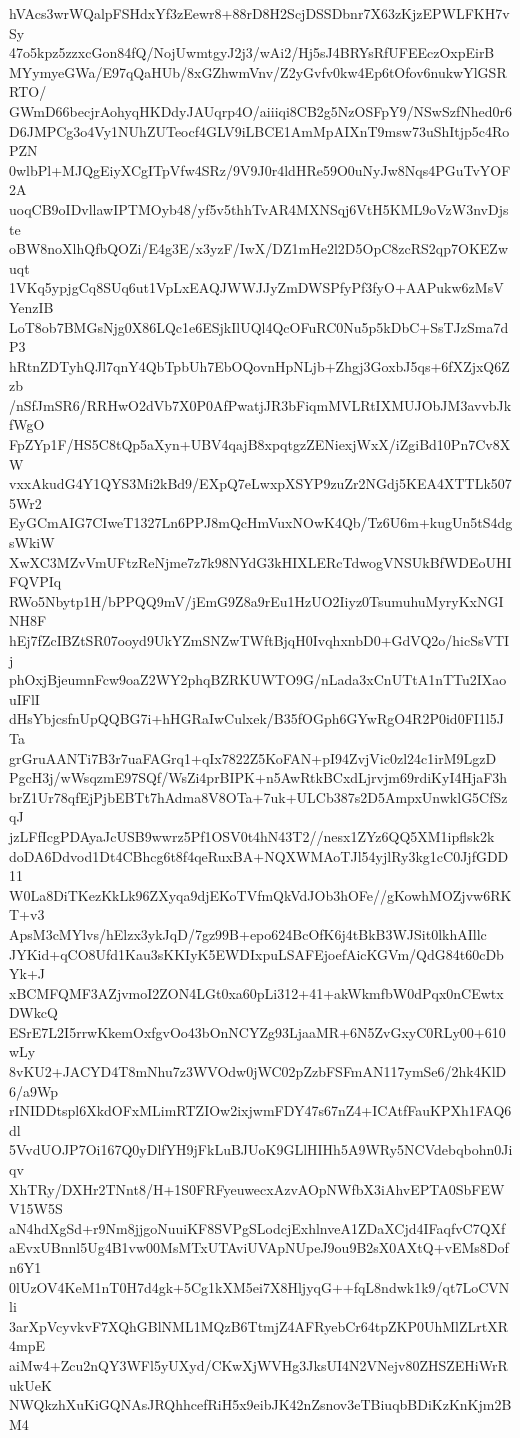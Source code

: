 hVAcs3wrWQalpFSHdxYf3zEewr8+88rD8H2ScjDSSDbnr7X63zKjzEPWLFKH7vSy
47o5kpz5zzxcGon84fQ/NojUwmtgyJ2j3/wAi2/Hj5sJ4BRYsRfUFEEczOxpEirB
MYymyeGWa/E97qQaHUb/8xGZhwmVnv/Z2yGvfv0kw4Ep6tOfov6nukwYlGSRRTO/
GWmD66becjrAohyqHKDdyJAUqrp4O/aiiiqi8CB2g5NzOSFpY9/NSwSzfNhed0r6
D6JMPCg3o4Vy1NUhZUTeocf4GLV9iLBCE1AmMpAIXnT9msw73uShItjp5c4RoPZN
0wlbPl+MJQgEiyXCgITpVfw4SRz/9V9J0r4ldHRe59O0uNyJw8Nqs4PGuTvYOF2A
uoqCB9oIDvllawIPTMOyb48/yf5v5thhTvAR4MXNSqj6VtH5KML9oVzW3nvDjste
oBW8noXlhQfbQOZi/E4g3E/x3yzF/IwX/DZ1mHe2l2D5OpC8zcRS2qp7OKEZwuqt
1VKq5ypjgCq8SUq6ut1VpLxEAQJWWJJyZmDWSPfyPf3fyO+AAPukw6zMsVYenzIB
LoT8ob7BMGsNjg0X86LQc1e6ESjkIlUQl4QcOFuRC0Nu5p5kDbC+SsTJzSma7dP3
hRtnZDTyhQJl7qnY4QbTpbUh7EbOQovnHpNLjb+Zhgj3GoxbJ5qs+6fXZjxQ6Zzb
/nSfJmSR6/RRHwO2dVb7X0P0AfPwatjJR3bFiqmMVLRtIXMUJObJM3avvbJkfWgO
FpZYp1F/HS5C8tQp5aXyn+UBV4qajB8xpqtgzZENiexjWxX/iZgiBd10Pn7Cv8XW
vxxAkudG4Y1QYS3Mi2kBd9/EXpQ7eLwxpXSYP9zuZr2NGdj5KEA4XTTLk5075Wr2
EyGCmAIG7CIweT1327Ln6PPJ8mQcHmVuxNOwK4Qb/Tz6U6m+kugUn5tS4dgsWkiW
XwXC3MZvVmUFtzReNjme7z7k98NYdG3kHIXLERcTdwogVNSUkBfWDEoUHIFQVPIq
RWo5Nbytp1H/bPPQQ9mV/jEmG9Z8a9rEu1HzUO2Iiyz0TsumuhuMyryKxNGINH8F
hEj7fZcIBZtSR07ooyd9UkYZmSNZwTWftBjqH0IvqhxnbD0+GdVQ2o/hicSsVTIj
phOxjBjeumnFcw9oaZ2WY2phqBZRKUWTO9G/nLada3xCnUTtA1nTTu2IXaouIFlI
dHsYbjcsfnUpQQBG7i+hHGRaIwCulxek/B35fOGph6GYwRgO4R2P0id0FI1l5JTa
grGruAANTi7B3r7uaFAGrq1+qIx7822Z5KoFAN+pI94ZvjVic0zl24c1irM9LgzD
PgcH3j/wWsqzmE97SQf/WsZi4prBIPK+n5AwRtkBCxdLjrvjm69rdiKyI4HjaF3h
brZ1Ur78qfEjPjbEBTt7hAdma8V8OTa+7uk+ULCb387s2D5AmpxUnwklG5CfSzqJ
jzLFfIcgPDAyaJcUSB9wwrz5Pf1OSV0t4hN43T2//nesx1ZYz6QQ5XM1ipflsk2k
doDA6Ddvod1Dt4CBhcg6t8f4qeRuxBA+NQXWMAoTJl54yjlRy3kg1cC0JjfGDD11
W0La8DiTKezKkLk96ZXyqa9djEKoTVfmQkVdJOb3hOFe//gKowhMOZjvw6RKT+v3
ApsM3cMYlvs/hElzx3ykJqD/7gz99B+epo624BcOfK6j4tBkB3WJSit0lkhAIllc
JYKid+qCO8Ufd1Kau3sKKIyK5EWDIxpuLSAFEjoefAicKGVm/QdG84t60cDbYk+J
xBCMFQMF3AZjvmoI2ZON4LGt0xa60pLi312+41+akWkmfbW0dPqx0nCEwtxDWkcQ
ESrE7L2I5rrwKkemOxfgvOo43bOnNCYZg93LjaaMR+6N5ZvGxyC0RLy00+610wLy
8vKU2+JACYD4T8mNhu7z3WVOdw0jWC02pZzbFSFmAN117ymSe6/2hk4KlD6/a9Wp
rINIDDtspl6XkdOFxMLimRTZIOw2ixjwmFDY47s67nZ4+ICAtfFauKPXh1FAQ6dl
5VvdUOJP7Oi167Q0yDlfYH9jFkLuBJUoK9GLlHIHh5A9WRy5NCVdebqbohn0Jiqv
XhTRy/DXHr2TNnt8/H+1S0FRFyeuwecxAzvAOpNWfbX3iAhvEPTA0SbFEWV15W5S
aN4hdXgSd+r9Nm8jjgoNuuiKF8SVPgSLodcjExhlnveA1ZDaXCjd4IFaqfvC7QXf
aEvxUBnnl5Ug4B1vw00MsMTxUTAviUVApNUpeJ9ou9B2sX0AXtQ+vEMs8Dofn6Y1
0lUzOV4KeM1nT0H7d4gk+5Cg1kXM5ei7X8HljyqG++fqL8ndwk1k9/qt7LoCVNli
3arXpVcyvkvF7XQhGBlNML1MQzB6TtmjZ4AFRyebCr64tpZKP0UhMlZLrtXR4mpE
aiMw4+Zcu2nQY3WFl5yUXyd/CKwXjWVHg3JksUI4N2VNejv80ZHSZEHiWrRukUeK
NWQkzhXuKiGQNAsJRQhhcefRiH5x9eibJK42nZsnov3eTBiuqbBDiKzKnKjm2BM4
